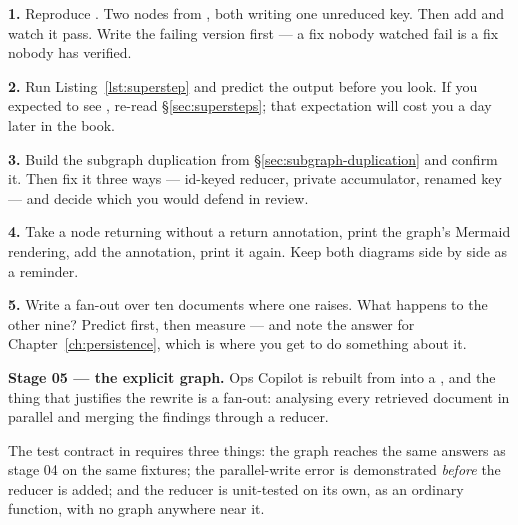 \begin{exercisebox}
\textbf{1.} Reproduce . Two nodes from , both
writing one unreduced key. Then add  and
watch it pass. Write the failing version first --- a fix nobody watched fail is a
fix nobody has verified.

\textbf{2.} Run Listing~\ref{lst:superstep} and predict the output before you
look. If you expected  to see , re-read
\S\ref{sec:supersteps}; that expectation will cost you a day later in the book.

\textbf{3.} Build the subgraph duplication from \S\ref{sec:subgraph-duplication}
and confirm it. Then fix it three ways --- id-keyed reducer, private accumulator,
renamed key --- and decide which you would defend in review.

\textbf{4.} Take a node returning  without a return annotation,
print the graph's Mermaid rendering, add the annotation, print it again. Keep
both diagrams side by side as a reminder.

\textbf{5.} Write a  fan-out over ten documents where one raises. What
happens to the other nine? Predict first, then measure --- and note the answer
for Chapter~\ref{ch:persistence}, which is where you get to do something about
it.
\end{exercisebox}

\begin{projectbox}
\textbf{Stage 05 --- the explicit graph.} Ops Copilot is rebuilt from
 into a , and the thing that justifies the
rewrite is a  fan-out: analysing every retrieved document in parallel
and merging the findings through a reducer.

The test contract in  requires three things:
the graph reaches the same answers as stage 04 on the same fixtures; the
parallel-write error is demonstrated \emph{before} the reducer is added; and the
reducer is unit-tested on its own, as an ordinary function, with no graph
anywhere near it.
\end{projectbox}
